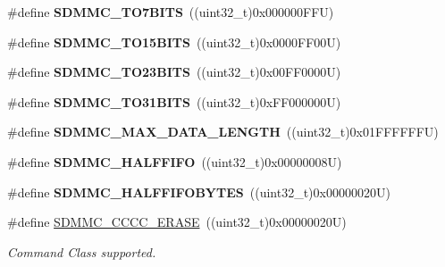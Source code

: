 \begin{DoxyCompactItemize}
\#define {\bfseries S\+D\+M\+M\+C\+\_\+T\+O7\+B\+I\+TS}~((uint32\+\_\+t)0x000000\+F\+F\+U)
\item 
\mbox{\label{group___s_d_m_m_c___l_l___exported___constants_ga28af7c4f1b65d6941a614aa04cb9b701}} 
\#define {\bfseries S\+D\+M\+M\+C\+\_\+T\+O15\+B\+I\+TS}~((uint32\+\_\+t)0x0000\+F\+F00\+U)
\item 
\mbox{\label{group___s_d_m_m_c___l_l___exported___constants_ga21ad6178ee58c29a161902967f415882}} 
\#define {\bfseries S\+D\+M\+M\+C\+\_\+T\+O23\+B\+I\+TS}~((uint32\+\_\+t)0x00\+F\+F0000\+U)
\item 
\mbox{\label{group___s_d_m_m_c___l_l___exported___constants_ga33cbe8ce02d0fdc6f87d6c8d5d2e75f8}} 
\#define {\bfseries S\+D\+M\+M\+C\+\_\+T\+O31\+B\+I\+TS}~((uint32\+\_\+t)0x\+F\+F000000\+U)
\item 
\mbox{\label{group___s_d_m_m_c___l_l___exported___constants_gade6b549011f328eb15a5fc1ab728669f}} 
\#define {\bfseries S\+D\+M\+M\+C\+\_\+\+M\+A\+X\+\_\+\+D\+A\+T\+A\+\_\+\+L\+E\+N\+G\+TH}~((uint32\+\_\+t)0x01\+F\+F\+F\+F\+F\+F\+U)
\item 
\mbox{\label{group___s_d_m_m_c___l_l___exported___constants_ga93c503829010f7309651d673cef49388}} 
\#define {\bfseries S\+D\+M\+M\+C\+\_\+\+H\+A\+L\+F\+F\+I\+FO}~((uint32\+\_\+t)0x00000008\+U)
\item 
\mbox{\label{group___s_d_m_m_c___l_l___exported___constants_ga32764efe214cfc0b9c5cfd9ed9756b40}} 
\#define {\bfseries S\+D\+M\+M\+C\+\_\+\+H\+A\+L\+F\+F\+I\+F\+O\+B\+Y\+T\+ES}~((uint32\+\_\+t)0x00000020\+U)
\item 
\mbox{\label{group___s_d_m_m_c___l_l___exported___constants_ga102b1b4370dd335014dc46f58538456a}} 
\#define \mbox{\hyperlink{group___s_d_m_m_c___l_l___exported___constants_ga102b1b4370dd335014dc46f58538456a}{S\+D\+M\+M\+C\+\_\+\+C\+C\+C\+C\+\_\+\+E\+R\+A\+SE}}~((uint32\+\_\+t)0x00000020\+U)
\begin{DoxyCompactList}\small\item\em Command Class supported. \end{DoxyCompactList}\item 

\end{DoxyCompactItemize}
